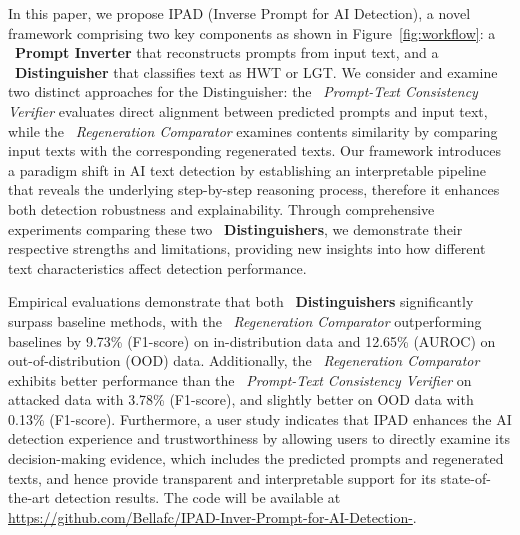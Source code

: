 In this paper, we propose IPAD (Inverse Prompt for AI Detection), a novel framework comprising two key components as shown in Figure~\ref{fig:workflow}: a ~\textbf{Prompt Inverter} that reconstructs prompts from input text, and a ~\textbf{Distinguisher} that classifies text as HWT or LGT. We consider and examine two distinct approaches for the Distinguisher: the ~\textit{Prompt-Text Consistency Verifier} evaluates direct alignment between predicted prompts and input text, while the ~\textit{Regeneration Comparator} examines contents similarity by comparing input texts with the corresponding regenerated texts. Our framework introduces a paradigm shift in AI text detection by establishing an interpretable pipeline that reveals the underlying step-by-step reasoning process, therefore it enhances both detection robustness and explainability. Through comprehensive experiments comparing these two ~\textbf{Distinguishers}, we demonstrate their respective strengths and limitations, providing new insights into how different text characteristics affect detection performance.



Empirical evaluations demonstrate that both ~\textbf{Distinguishers} significantly surpass baseline methods, with the ~\textit{Regeneration Comparator} outperforming baselines by 9.73\% (F1-score) on in-distribution data and 12.65\% (AUROC) on out-of-distribution (OOD) data. Additionally, the ~\textit{Regeneration Comparator} exhibits better performance than the ~\textit{Prompt-Text Consistency Verifier} on attacked data with 3.78\% (F1-score), and slightly better on OOD data with 0.13\% (F1-score). Furthermore, a user study indicates that IPAD enhances the AI detection experience and trustworthiness by allowing users to directly examine its decision-making evidence, which includes the predicted prompts and regenerated texts, and hence provide transparent and interpretable support for its state-of-the-art detection results. 
%
The code will be available at \url{https://github.com/Bellafc/IPAD-Inver-Prompt-for-AI-Detection-}.
%
